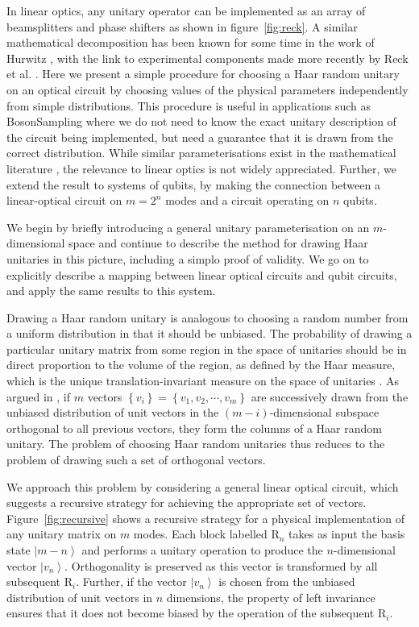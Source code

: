 \documentclass[aps,prl,twocolumn,floatfix]{revtex4}
\newcommand{\mat}[1]{\mathrm{#1}}
\newcommand{\bosonsampling}{\textsc BosonSampling}
\newcommand{\ket}[1]{\left|#1\right\rangle}
\begin{document}
In linear optics, any unitary operator can be implemented as an array of
beamsplitters and phase shifters as shown in figure~\ref{fig:reck}. A similar
mathematical decomposition has been known for some time in the work of Hurwitz
\cite{hurwitz}, with the link to experimental components made more recently by
Reck et al. \cite{re-prl-73-58}. Here we present a simple procedure for choosing
a Haar random unitary on an optical circuit by choosing values of the physical
parameters independently from simple distributions. This procedure is useful in
applications such as \bosonsampling{} where we do not need to know the exact
unitary description of the circuit being implemented, but need a guarantee that
it is drawn from the correct distribution. While similar parameterisations exist
in the mathematical literature \cite{sp-jmp-53-013501, zy-jpa-27-4235}, the
relevance to linear optics is not widely appreciated. Further, we extend the
result to systems of qubits, by making the connection between a linear-optical
circuit on \(m=2^{n}\) modes and a circuit operating on \(n\) qubits.

We begin by briefly introducing a general unitary parameterisation on an
\(m\)-dimensional space and continue to describe the method for drawing Haar
unitaries in this picture, including a simplo proof of validity. We go on to
explicitly describe a mapping between linear optical circuits and qubit
circuits, and apply the same results to this system.

Drawing a Haar random unitary is analogous to choosing a random number from a
uniform distribution in that it should be unbiased. The probability of drawing
a particular unitary matrix from some region in the space of unitaries should
be in direct proportion to the volume of the region, as defined by the Haar
measure, which is the unique translation-invariant measure on the space of
unitaries \cite{re-phd}. As argued in \cite{re-phd}, if \(m\) vectors \(\left\{
v_{i} \right\} = \left\{ v_{1}, v_{2}, \cdots, v_{m} \right\}\) are successively
drawn from the unbiased distribution of unit vectors in the
\(\left(m-i\right)\)-dimensional subspace orthogonal to all previous vectors,
they form the columns of a Haar random unitary. The problem of choosing Haar
random unitaries thus reduces to the problem of drawing such a set of orthogonal
vectors.

We approach this problem by considering a general linear optical circuit, which
suggests a recursive strategy for achieving the appropriate set of vectors.
Figure~\ref{fig:recursive} shows a recursive strategy for a physical
implementation
of any unitary matrix on \(m\) modes. Each block labelled \(\mat{R}_{n}\) takes
as input the basis state \( \ket{m-n}\) and performs a unitary operation to
produce the \(n\)-dimensional vector \(\ket{v_n}\). Orthogonality is preserved
as this vector is transformed by all subsequent \(\mat{R}_{i}\). Further, if the
vector \(\ket{v_{n}}\) is chosen from the unbiased distribution of unit vectors
in \(n\) dimensions, the property of left invariance ensures that it does not
become biased by the operation of the subsequent \(\mat{R}_{i}\).
\end{document}
